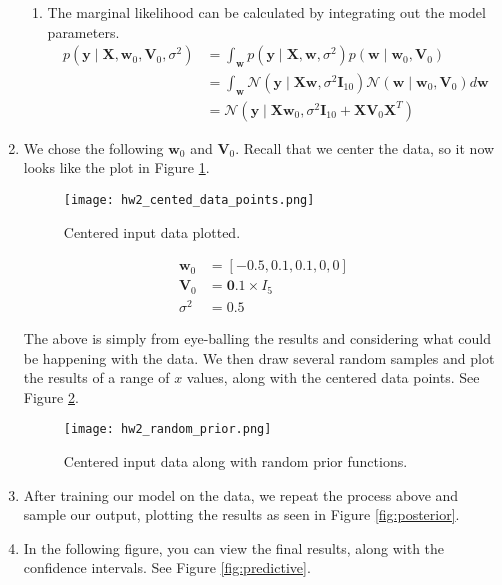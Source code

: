 \documentclass[submit]{harvardml}
\newcommand{\by}{\mathbf{y}}
\newcommand{\bw}{\mathbf{w}}
\newcommand{\distNorm}{\mathcal{N}}
\begin{document}
\begin{enumerate}
\begin{enumerate}
\item The marginal likelihood can be calculated by integrating out the model parameters.
\begin{align*}
p(\by \mid \mathbf X, \bw_0, \mathbf V_0, \sigma^2) &= \int_{\bw} p(\by \mid \mathbf X, \bw, \sigma^2)p(\bw \mid \bw_0, \mathbf V_0) \tag{integrate out weights} \\
&= \int_{\bw} \distNorm(\by \mid \mathbf X \bw, \sigma^2 \mathbf I_{10}) \distNorm(\bw \mid \bw_0, \mathbf V_0) d\bw  \tag{model}\\
&= \distNorm(\by \mid \mathbf X\bw_0, \sigma^2 \mathbf I_{10} + \mathbf X \mathbf V_0 \mathbf X^T) \tag{conjugacy results from Murphy 4.126}
\end{align*}
\end{enumerate}

\item We chose the following $\bw_0$ and $\mathbf V_0$. Recall that we center the data, so it now looks like the plot in Figure \ref{fig:centered_data}.
\begin{figure}[!h]
\centering
\texttt{[image: hw2\_cented\_data\_points.png]}
\caption{Centered input data plotted.}
\label{fig:centered_data}
\end{figure}
\begin{align*}
\bw_0 &= [-0.5, 0.1, 0.1, 0, 0] \\
\mathbf V_0 &= \mathbf 0.1 \times I_{5} \\
\sigma^2 &= 0.5
\end{align*}

The above is simply from eye-balling the results and considering what could be happening with the data. We then draw several random samples  and plot the results of a range of $x$ values, along with the centered data points. See Figure \ref{fig:prior}.
\begin{figure}[!h]
\centering
\texttt{[image: hw2\_random\_prior.png]}
\caption{Centered input data along with random prior functions.}
\label{fig:prior}
\end{figure}

\item After training our model on the data, we repeat the process above and sample our output, plotting the results as seen in Figure \ref{fig:posterior}.

\item In the following figure, you can view the final results, along with the confidence intervals. See Figure \ref{fig:predictive}.


\end{enumerate}
\end{document}
